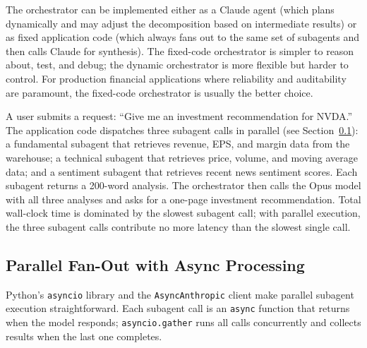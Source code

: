 The orchestrator can be implemented either as a Claude agent (which plans dynamically
and may adjust the decomposition based on intermediate results) or as fixed application
code (which always fans out to the same set of subagents and then calls Claude for
synthesis). The fixed-code orchestrator is simpler to reason about, test, and debug;
the dynamic orchestrator is more flexible but harder to control. For production
financial applications where reliability and auditability are paramount, the fixed-code
orchestrator is usually the better choice.

\begin{example}
\label{ex:orchestrator}
A user submits a request: ``Give me an investment recommendation for NVDA.'' The
application code dispatches three subagent calls in parallel (see
Section~\ref{app:sdk-commercial:workflows:parallel}): a fundamental subagent that
retrieves revenue, EPS, and margin data from the warehouse; a technical subagent
that retrieves price, volume, and moving average data; and a sentiment subagent that
retrieves recent news sentiment scores. Each subagent returns a 200-word analysis.
The orchestrator then calls the Opus model with all three analyses and asks for a
one-page investment recommendation. Total wall-clock time is dominated by the slowest
subagent call; with parallel execution, the three subagent calls contribute no more
latency than the slowest single call.
\end{example}

\subsection{Parallel Fan-Out with Async Processing}
\label{app:sdk-commercial:workflows:parallel}

Python's \texttt{asyncio} library and the \texttt{AsyncAnthropic} client make parallel
subagent execution straightforward. Each subagent call is an \texttt{async} function
that returns when the model responds; \texttt{asyncio.gather} runs all calls
concurrently and collects results when the last one completes.

